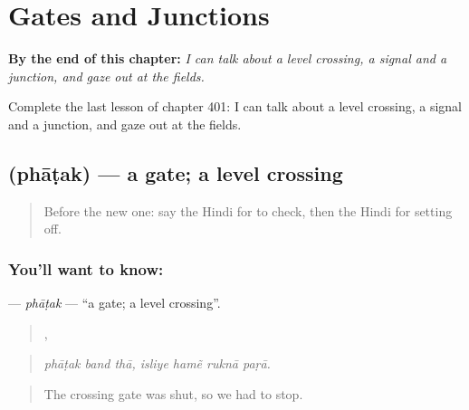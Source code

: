 
\chapter{Gates and Junctions}
\label{ch:hi-gates-and-junctions}

\begin{chapteropening}
\textbf{By the end of this chapter:} \emph{I can talk about a level crossing, a signal and a junction, and gaze out at the fields.}

Complete the last lesson of chapter 401: I can talk about a level crossing, a signal and a junction, and gaze out at the fields.
\end{chapteropening}

\section[\texorpdfstring{\hi{फाटक} (phāṭak)}{फाटक (phāṭak)}]{ (phāṭak) — a gate; a level crossing}

\label{lesson:HI-C401-phatak}



\begin{quote}
Before the new one: say the Hindi for to check, then the Hindi for setting off.
\end{quote}

\subsection*{You'll want to know: }
\textbf{} — \emph{phāṭak} — \textquotedblleft{}a gate; a level crossing\textquotedblright{}.

\begin{quote}
  ,    
\end{quote}

\begin{quote}
\emph{phāṭak band thā, isliye hamẽ ruknā paṛā.}
\end{quote}

\begin{quote}
The crossing gate was shut, so we had to stop.
\end{quote}

